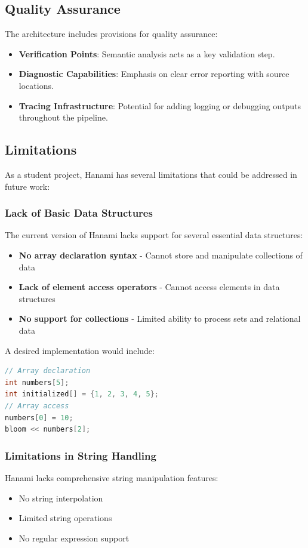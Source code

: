 \documentclass[conference]{IEEEtran}
\begin{document}
\subsection{Quality Assurance}
The architecture includes provisions for quality assurance:
\begin{itemize}
    \item \textbf{Verification Points}: Semantic analysis acts as a key validation step.
    \item \textbf{Diagnostic Capabilities}: Emphasis on clear error reporting with source locations.
    \item \textbf{Tracing Infrastructure}: Potential for adding logging or debugging outputs throughout the pipeline.
\end{itemize}


\subsection{Limitations}
As a student project, Hanami has several limitations that could be addressed in future work:
\subsubsection{Lack of Basic Data Structures}
The current version of Hanami lacks support for several essential data structures:
\begin{itemize}
\item \textbf{No array declaration syntax} - Cannot store and manipulate collections of data
\item \textbf{Lack of element access operators} - Cannot access elements in data structures
\item \textbf{No support for collections} - Limited ability to process sets and relational data
\end{itemize}
A desired implementation would include:
\begin{lstlisting}[language=C++, caption={Desired array implementation example}, label={lst:desired_array_impl}, basicstyle=\ttfamily\scriptsize, columns=flexible]
// Array declaration
int numbers[5];
int initialized[] = {1, 2, 3, 4, 5};
// Array access
numbers[0] = 10;
bloom << numbers[2];
\end{lstlisting}

\subsubsection{Limitations in String Handling}
Hanami lacks comprehensive string manipulation features:
\begin{itemize}
\item No string interpolation
\item Limited string operations
\item No regular expression support
\end{itemize}
\end{document}
